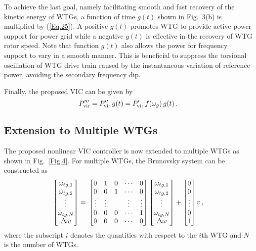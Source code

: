 \documentclass[journal]{IEEEtran}
\begin{document}
To achieve the last goal, namely facilitating smooth
and fast recovery of the kinetic energy of WTGs, a function of time $g (t)$ shown in Fig.~3(b) is multiplied by (\ref{Eq.25}). A positive $g(t)$ promotes WTG to provide active power support for power grid while a negative $g(t)$ is effective in the recovery of WTG rotor speed. Note that function $g(t)$ also allows the power for frequency support to vary in a smooth manner. This is beneficial to suppress the torsional oscillation of WTG drive train caused by the instantaneous variation of reference power, avoiding the secondary frequency dip.

Finally, the proposed VIC can be given by 
\begin{equation}
  \label{Eq.26}
  P'''_{\rm vir}=  P''_{\rm vir} \, g(t) = P'_{\rm vir} \, f(\omega_g) \, g(t) \, .
\end{equation}

\subsection{Extension to Multiple WTGs}
The proposed nonlinear VIC controller is now extended to multiple WTGs as shown in Fig.~\ref{Fig.4}. For multiple WTGs, the Brunovsky system can be constructed as
%
\begin{equation}
  \begin{bmatrix}
    \Dot{\omega}_{tg,1}\\
    \Dot{\omega}_{tg,2}\\
    \vdots\\
    \Dot{\omega}_{tg, N}\\
    \Delta \Dot{\omega}
  \end{bmatrix} = \\
  \begin{bmatrix}
    0&1&0&\cdots&0\\
    0&   0&   1& \cdots & 0\\
    \vdots& \vdots&  &  \vdots&  \vdots\\
    0& 0& 0& \cdots&  1\\
    0& 0& 0& \cdots& 0
  \end{bmatrix}
  \begin{bmatrix}
    \omega_{tg,1} \\
    \omega_{tg,2} \\
    \vdots \\
    \omega_{tg,N} \\
    \Delta \omega
  \end{bmatrix} +
  \begin{bmatrix}
    0\\0\\ \vdots\\0\\1
  \end{bmatrix} v \, ,  
  \label{Eq.27}
\end{equation}
%
where the subscript $i$ denotes the quantities with respect to the $i$th WTG and $N$ is the number of WTGs.
\end{document}
